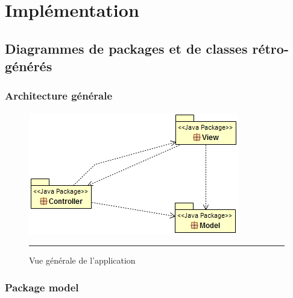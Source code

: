 
\chapter{Implémentation} %

\label{Chapter3} %



\section{Diagrammes de packages et de classes rétro-générés}

\subsection{Architecture générale}
\begin{figure}[H]
	\centering
		\includegraphics{Figures/retro_archi}
		\rule{35em}{0.5pt}
	\caption[Vue générale de l'application]{Vue générale de l'application}
\end{figure}

\subsection{Package model}

